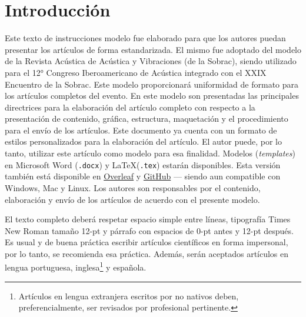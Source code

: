 \documentclass[12pt, a4paper, twoside, twocolumn]{article}
\begin{document}
 \setcounter{page}{1} 
\clearpage %

\section{Introducción}
Este texto de instrucciones modelo fue elaborado para que los autores puedan presentar los artículos de forma estandarizada. El mismo fue adoptado del modelo de la Revista Acústica de Acústica y Vibraciones (de la Sobrac), siendo utilizado para el 12° Congreso Iberoamericano de Acústica integrado con el XXIX Encuentro de la Sobrac.
%
Este modelo proporcionará uniformidad de formato para los artículos completos del evento.
En este modelo son presentadas las principales directrices para la elaboración del artículo completo con respecto a la presentación de contenido, gráfica, estructura, maquetación y el procedimiento para el envío de los artículos.
Este documento ya cuenta con un formato de estilos personalizados para la elaboración del artículo. El autor puede, por lo tanto, utilizar este artículo como modelo para esa finalidad. Modelos (\textit{templates}) en Microsoft Word (\texttt{.docx}) y \LaTeX\xspace (\texttt{.tex}) estarán disponibles. Esta versión también está disponible en \href{https://www.overleaf.com/read/rnfjxkknksnd}{Overleaf} y \href{https://github.com/willdfonseca/fia2020}{GitHub} --- siendo aun compatible con Windows, Mac y Linux.
Los autores son responsables por el contenido, elaboración y envío de los artículos de acuerdo con el presente modelo.


El texto completo deberá respetar espacio simple entre líneas, tipografía Times New Roman tamaño 12-pt y párrafo con espacios de 0-pt antes y 12-pt después. Es usual y de buena práctica escribir artículos científicos en forma impersonal, por lo tanto, se recomienda esa práctica. Además, serán aceptados artículos en lengua portuguesa, inglesa\footnote{ Artículos en lengua extranjera escritos por no nativos deben, preferencialmente, ser revisados por profesional pertinente.} y española.
\end{document}
